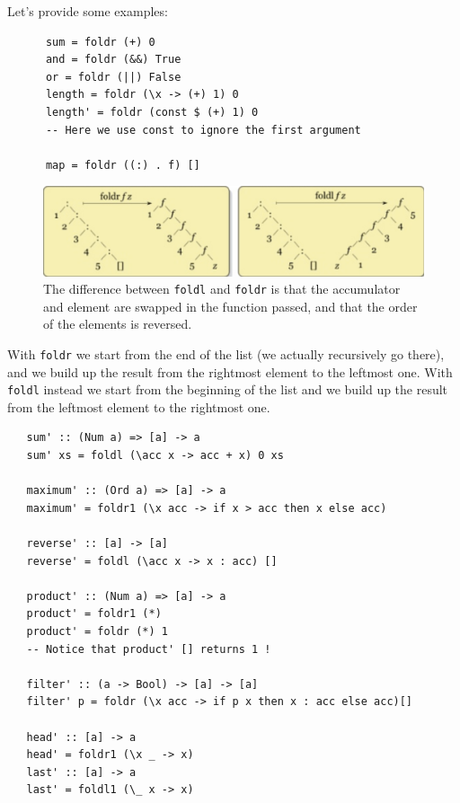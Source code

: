 \begin{paracol}{2}
   
   Let's provide some examples:
   \begin{lstlisting}
      sum = foldr (+) 0
      and = foldr (&&) True
      or = foldr (||) False
      length = foldr (\x -> (+) 1) 0
      length' = foldr (const $ (+) 1) 0 
      -- Here we use const to ignore the first argument
      
      map = foldr ((:) . f) []
   \end{lstlisting}
   
   \switchcolumn

   \begin{figure}[htbp]
      \centering
      \includegraphics[width=0.95\columnwidth]{images/fold.png}
      \caption{
         The difference between \lstinline|foldl| and \lstinline|foldr| is that the accumulator and element are swapped in the function passed, and that the order of the elements is reversed.
      }
      \label{fig:fold}
   \end{figure}

\end{paracol}
With \lstinline|foldr| we start from the end of the list (we actually recursively go there), and we build up the result from the rightmost element to the leftmost one.
With \lstinline|foldl| instead we start from the beginning of the list and we build up the result from the leftmost element to the rightmost one.

\begin{lstlisting}
   sum' :: (Num a) => [a] -> a
   sum' xs = foldl (\acc x -> acc + x) 0 xs
   
   maximum' :: (Ord a) => [a] -> a
   maximum' = foldr1 (\x acc -> if x > acc then x else acc)
   
   reverse' :: [a] -> [a]
   reverse' = foldl (\acc x -> x : acc) []
   
   product' :: (Num a) => [a] -> a
   product' = foldr1 (*)
   product' = foldr (*) 1
   -- Notice that product' [] returns 1 !

   filter' :: (a -> Bool) -> [a] -> [a]
   filter' p = foldr (\x acc -> if p x then x : acc else acc)[]
   
   head' :: [a] -> a
   head' = foldr1 (\x _ -> x)
   last' :: [a] -> a
   last' = foldl1 (\_ x -> x)
\end{lstlisting}

